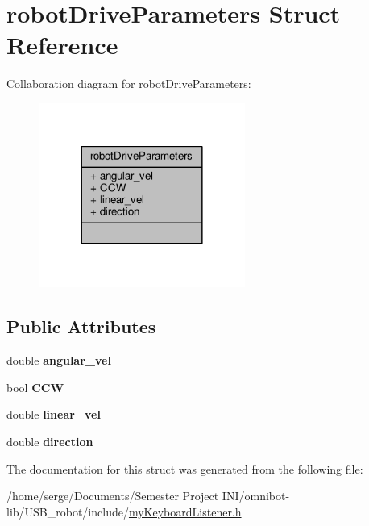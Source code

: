\hypertarget{structrobot_drive_parameters}{}\section{robot\+Drive\+Parameters Struct Reference}
\label{structrobot_drive_parameters}


Collaboration diagram for robot\+Drive\+Parameters\+:
\nopagebreak
\begin{figure}[H]
\begin{center}
\leavevmode
\includegraphics[width=192pt]{structrobot_drive_parameters__coll__graph}
\end{center}
\end{figure}
\subsection*{Public Attributes}
\begin{DoxyCompactItemize}
\item 
\hypertarget{structrobot_drive_parameters_a2b64928c6867161fa4e01e38983887a2}{}double {\bfseries angular\+\_\+vel}\label{structrobot_drive_parameters_a2b64928c6867161fa4e01e38983887a2}

\item 
\hypertarget{structrobot_drive_parameters_ab77a28e264d1f1b2372cca0658f027f4}{}bool {\bfseries C\+C\+W}\label{structrobot_drive_parameters_ab77a28e264d1f1b2372cca0658f027f4}

\item 
\hypertarget{structrobot_drive_parameters_a5dd169a5b0c88a2016fd8cd597474be1}{}double {\bfseries linear\+\_\+vel}\label{structrobot_drive_parameters_a5dd169a5b0c88a2016fd8cd597474be1}

\item 
\hypertarget{structrobot_drive_parameters_ad1a4776988a48cc58fdd71e2eb8447fe}{}double {\bfseries direction}\label{structrobot_drive_parameters_ad1a4776988a48cc58fdd71e2eb8447fe}

\end{DoxyCompactItemize}


The documentation for this struct was generated from the following file\+:\begin{DoxyCompactItemize}
\item 
/home/serge/\+Documents/\+Semester Project I\+N\+I/omnibot-\/lib/\+U\+S\+B\+\_\+robot/include/\hyperlink{my_keyboard_listener_8h}{my\+Keyboard\+Listener.\+h}\end{DoxyCompactItemize}
